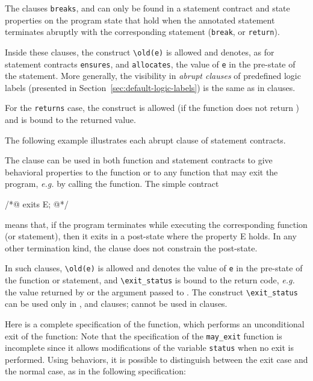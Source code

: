 The clauses \lstinline|breaks|, \continues{} 
and \returns{}
can only be found in a statement contract and
state properties on the program state that hold when the
annotated statement terminates abruptly with the corresponding
statement (\lstinline|break|, \Continue{} or \lstinline|return|).

Inside these clauses, the construct \lstinline|\old(e)|
is allowed and denotes, as for statement contracts
\lstinline|ensures|, \assigns and \lstinline|allocates|, the value of
\lstinline|e| in the pre-state of the statement.
 More generally, the visibility in \textsl{abrupt clauses} of predefined 
logic labels
 (presented in Section~\ref{sec:default-logic-labels}) is the 
same as in \ensures{} clauses.

For the \lstinline|returns| case, the \result{}
construct is allowed (if the function does not return \void) and is bound
to the returned value.

\begin{example}
  The following example illustrates each abrupt
  clause of statement contracts.
\end{example}

The \exits{} clause can be used in both function and statement
contracts to give behavioral properties to the \main{} function
or to any function that may exit the program,
\emph{e.g.} by calling the \exit{} function.
The simple contract
\begin{listing-nonumber}
/*@ exits E;
  @*/
\end{listing-nonumber}
means that, if the program terminates while executing the corresponding
function (or statement), then it exits in a post-state where the property
E holds.
In any other termination kind, the \exits{} clause does not constrain
the post-state.

In such clauses, \lstinline|\old(e)|
is allowed and denotes the value of \lstinline|e| in the pre-state of
the function or statement,
and \lstinline|\exit_status| is bound to the return code,
\emph{e.g.} the value returned by \main{} or the argument passed to \exit{}.
The  construct \lstinline|\exit_status|
can be used only in \exits{},
 \assigns{} and \allocates{} clauses;
\result cannot be used in \exits{} clauses.

\begin{example}
\label{ex:assigns-and-abrupt-termination}
  Here is a complete specification of the \exit{} function, which
  performs an unconditional exit of the \main{} function:
  Note that the specification of the \lstinline|may_exit|
  function is incomplete since it allows modifications of the variable
  \lstinline|status| when no exit is performed.
  Using behaviors, it is possible to distinguish between the exit case
  and the normal case, as in the following specification:
\end{example}

